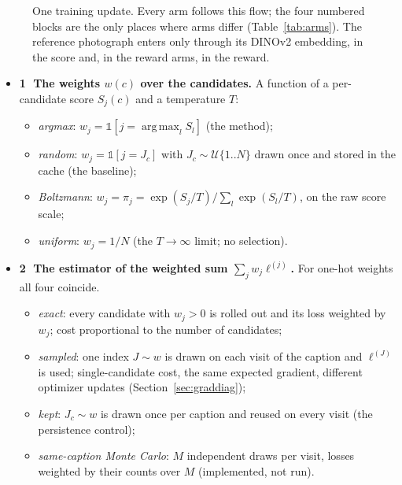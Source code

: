 \documentclass[11pt,a4paper]{article}
\DeclareMathOperator*{\argmax}{arg\,max}
\begin{document}
\begin{figure}[H]
{}
\caption{One training update. Every arm follows this flow; the four numbered blocks are the only places where arms differ (Table~\ref{tab:arms}). The reference photograph enters only through its DINOv2 embedding, in the score and, in the reward arms, in the reward.}
\label{fig:pipeline}
\end{figure}

\begin{itemize}
\item \textbf{\textcircled{1} The weights $w(c)$ over the candidates.} A function of a per-candidate score $S_j(c)$ and a temperature $T$:
  \begin{itemize}
  \item \emph{argmax}: $w_j=\mathbb{1}[j=\argmax_l S_l]$ (the method);
  \item \emph{random}: $w_j=\mathbb{1}[j=J_c]$ with $J_c\sim\mathcal{U}\{1..N\}$ drawn once and stored in the cache (the baseline);
  \item \emph{Boltzmann}: $w_j=\pi_j=\exp(S_j/T)\big/\sum_l\exp(S_l/T)$, on the raw score scale;
  \item \emph{uniform}: $w_j=1/N$ (the $T\to\infty$ limit; no selection).
  \end{itemize}
\item \textbf{\textcircled{2} The estimator of the weighted sum $\sum_jw_j\ell^{(j)}$.} For one-hot weights all four coincide.
  \begin{itemize}
  \item \emph{exact}: every candidate with $w_j>0$ is rolled out and its loss weighted by $w_j$; cost proportional to the number of candidates;
  \item \emph{sampled}: one index $J\sim w$ is drawn on each visit of the caption and $\ell^{(J)}$ is used; single-candidate cost, the same expected gradient, different optimizer updates (Section~\ref{sec:graddiag});
  \item \emph{kept}: $J_c\sim w$ is drawn once per caption and reused on every visit (the persistence control);
  \item \emph{same-caption Monte Carlo}: $M$ independent draws per visit, losses weighted by their counts over $M$ (implemented, not run).

\end{itemize}
\end{itemize}
\end{document}
